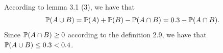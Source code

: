 According to lemma 3.1 (3), we have that 
\begin{equation}
\P(A \cup B) = \P(A) + \P(B) - \P(A \cap B) = 0.3 - \P(A \cap B).
\end{equation}
Since $ \P(A \cap B) \geq 0$ according to the definition 2.9, we have that $ \P(A \cup B) \leq 0.3 < 0.4$.
